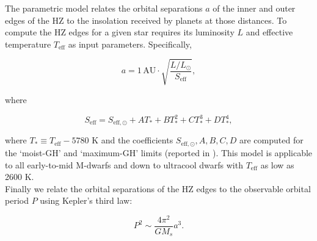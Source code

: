 The parametric model \parencite{kopparapu13} relates the orbital separations 
$a$ of the inner and outer edges of the HZ to the insolation received by planets 
at those distances. To compute the HZ edges for a given star requires its 
luminosity $L$ and effective temperature $T_{\mathrm{eff}}$ 
as input parameters. Specifically,

\begin{equation}
a = 1 \mathrm{\hspace{2pt} AU} \cdot \sqrt{\frac{L/L_{\odot}}{S_{\mathrm{eff}}}},
\end{equation}

\noindent where

\begin{equation}
S_{\mathrm{eff}} = S_{\mathrm{eff},\odot} + AT_* + BT_*^2 + CT_*^3 + DT_*^4,
\end{equation}

\noindent where $T_* \equiv T_{\mathrm{eff}}-5780$ K and the coefficients 
$S_{\mathrm{eff},\odot},A,B,C,D$ are computed for the `moist-GH' and `maximum-GH' 
limits (reported in \cite{kopparapu13}). This model is applicable to all 
early-to-mid M-dwarfs and down to ultracool dwarfs with $T_{\mathrm{eff}}$ as 
low as 2600 K. \\

Finally we relate the orbital separations of the HZ edges to the observable 
orbital period $P$ using Kepler's third law:

\begin{equation}
P^2 \sim \frac{4 \pi^2}{G M_s} a^3.
\label{eq:keplersthird}
\end{equation}

